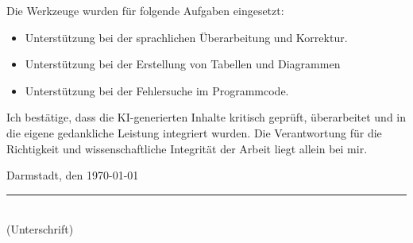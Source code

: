 \documentclass[
	ngerman,
	ruledheaders=section,%
	class=report,%
	thesis={type=master},%
	accentcolor=1d,%
	custommargins=true,%
	marginpar=false,%
	parskip=half-,%
	fontsize=11pt,%
]{tudapub}
\begin{document}
Die Werkzeuge wurden für folgende Aufgaben eingesetzt: 
\begin{itemize}
	\item Unterstützung bei der sprachlichen Überarbeitung und Korrektur.
	\item Unterstützung bei der Erstellung von Tabellen und Diagrammen
	\item Unterstützung bei der Fehlersuche im Programmcode.
\end{itemize}

Ich bestätige, dass die KI-generierten Inhalte kritisch geprüft, überarbeitet und in die eigene gedankliche Leistung integriert wurden. Die Verantwortung für die Richtigkeit und wissenschaftliche Integrität der Arbeit liegt allein bei mir.

\vspace{1cm}
\noindent Darmstadt, den \today \hfill \rule{5cm}{0.4pt}\\
\phantom{Darmstadt, den \today} \hfill \footnotesize (Unterschrift)
\end{document}
